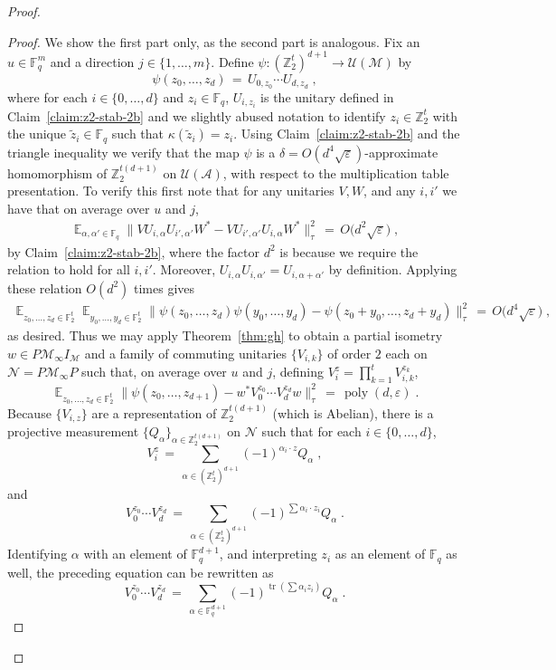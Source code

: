 \documentclass[11pt]{article}
\theoremstyle{definition}
\newcommand{\Id}{\ensuremath{I}}
\DeclareMathOperator*{\Expectation}{\mathbb{E}}
\newcommand{\Es}[1]{\Expectation_{#1}}
\newcommand{\F}{\ensuremath{\mathbb{F}}}
\newcommand{\Z}{\ensuremath{\mathbb{Z}}}
\newcommand{\mA}{\ensuremath{\mathcal{A}}}
\newcommand{\mM}{\ensuremath{\mathcal{M}}}
\newcommand{\mU}{\ensuremath{\mathcal{U}}}
\DeclareMathOperator{\poly}{poly}
\newcommand{\eps}{\varepsilon}
\newcommand{\mN}{\mathcal{N}}
\DeclareMathOperator{\tr}{tr}
\begin{document}
\begin{proof}
\begin{proof}
We show the first part only, as the second part is analogous. Fix an $u\in \F_q^m$ and a direction $j\in \{1,\ldots,m\}$. Define
$\psi: (\Z_2^{t})^{d+1} \to \mU(\mM)$ by 
\[\psi(z_0,\ldots,z_{d}) \,=\, U_{0,z_0} \cdots U_{d,z_{d}}\;,\]
where for each $i\in\{0,\ldots,d\}$ and $z_i\in \F_q$, $U_{i,z_i}$ is the unitary defined in Claim~\ref{claim:z2-stab-2b} and we slightly abused notation to identify $z_i\in \Z_2^t$ with the unique $\tilde{z}_i\in \F_q$ such that $\kappa(\tilde{z}_i)=z_i$. Using Claim~\ref{claim:z2-stab-2b} and the triangle inequality we verify that the map $\psi$ is a $\delta=O(d^4\sqrt{\eps})$-approximate homomorphism of $\Z_2^{t(d+1)}$ on $\mU(\mA)$, with respect to the multiplication table presentation. To verify this first note that for any unitaries $V,W$, and any $i,i'$ we have that on average over $u$ and $j$,
\begin{align*}
\Es{\alpha,\alpha'\in \F_q} \big\| V U_{i,\alpha} U_{i',\alpha'} W^* - V U_{i',\alpha'} U_{i,\alpha}  W^*\big\|_\tau^2 \,=\, O\big(d^2 \sqrt{\eps}\big)\;,
\end{align*}
by Claim~\ref{claim:z2-stab-2b}, where the factor $d^2$ is because we require the relation to hold for all $i,i'$. Moreover, $U_{i,\alpha}U_{i,\alpha'}=U_{i,\alpha+\alpha'}$ by definition. Applying these relation $O(d^2)$ times gives
\begin{align*}
 \Es{z_0,\ldots,z_d\in\F_2^t}\Es{y_0,\ldots,y_d\in\F_2^t}\big\|\psi(z_0,\ldots,z_d)\psi(y_0,\ldots,y_d) -\psi(z_0+y_0,\ldots,z_d+y_d)\big\|_\tau^2 \,=\, O\big(d^4 \sqrt{\eps}\big)\;,
\end{align*}
as desired.
Thus we may apply Theorem~\ref{thm:gh} to obtain a partial isometry $w\in P\mM_\infty\Id_\mM$ and a family of commuting unitaries $\{V_{i,k}\}$ of order $2$ each on $\mN=P\mM_\infty P$ such that, on average over $u$ and $j$, defining $V_i^z = \prod_{k=1}^t V_{i,k}^{z_k}$,
\begin{equation}\label{eq:z2-stab-3-1}
\Es{z_0,\ldots,z_{d}\in\F_2^t} \big\| \psi(z_0,\ldots,z_{d+1}) - w^* V_0^{z_0}\cdots V_{d}^{z_{d}} w \big\|_\tau^2 \,=\, \poly(d,\eps)\;.
\end{equation}
Because $\{V_{i,z}\}$ are a representation of $\Z_2^{t(d+1)}$ (which is Abelian), there is a projective measurement $\{Q_\alpha\}_{\alpha\in \Z_2^{t(d+1)}}$ on $\mN$ such that for each $i\in\{0,\ldots,d\}$, 
\[ V_{i}^{z} \,=\, \sum_{\alpha\in (\Z_2^{t})^{d+1}} (-1)^{\alpha_{i}\cdot z} Q_\alpha\;,\]
and  
\[ V_{0}^{z_0}\cdots V_{d}^{z_{d}}  \,=\, \sum_{\alpha\in (\Z_2^{t})^{d+1}} (-1)^{\sum \alpha_{i}\cdot z_i} Q_\alpha\;.\]
Identifying $\alpha$ with an element of $\F_q^{d+1}$, and interpreting $z_i$ as an element of $\F_q$ as well,
 the preceding equation can be rewritten as
\[ V_{0}^{z_0}\cdots V_{d}^{z_{d}}  \,=\, \sum_{\alpha\in \F_q^{d+1}} (-1)^{\tr(\sum \alpha_{i} z_i)} Q_\alpha\;.\]


\end{proof}
\end{proof}
\end{document}

